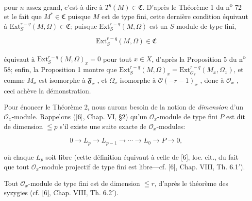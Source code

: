 pour $n$ assez grand, c'est-à-dire à $T^q(M) \in \mathfrak{C}$. D'après le Théorème 1 du n\textsuperscript{o} 72 et le fait que $M^* \in \mathfrak{C}$ puisque $M$ est de type fini, cette dernière condition équivaut à $\mathrm{Ext}_S^{r-q}(M, \Omega) \in \mathfrak{C}$; puisque $\mathrm{Ext}_S^{r-q}(M, \Omega)$ est un $S$-module de type fini,

\begin{equation*}
\mathrm{Ext}_S^{r-q}(M, \Omega) \in \mathfrak{C}
\end{equation*}

équivaut à $\mathrm{Ext}_S^{r-q}(M, \Omega)_x = 0$ pour tout $x \in X$, d'après la Proposition 5 du n\textsuperscript{o} 58; enfin, la Proposition 1 montre que $\mathrm{Ext}_S^{r-q}(M, \Omega)_x = \mathrm{Ext}_{\mathcal{O}_x}^{r-q}(M_x , \Omega_x)$, et comme $M_x$ est isomorphe à $\mathfrak{F}_x$ , et $\Omega_x$ isomorphe à $\mathcal{O}(-r - 1)_x$ , donc à $\mathcal{O}_x$ , ceci achève la démonstration.

Pour énoncer le Théorème 2, nous aurons besoin de la notion de \textit{dimension} d'un $\mathcal{O}_x$-module. Rappelons ([6], Chap. VI, \S2) qu'un $\mathcal{O}_x$-module de type fini $P$ est dit de dimension $\leqq p$ s'il existe une suite exacte de $\mathcal{O}_x$-modules:

\begin{equation*}
0 \rightarrow L_p \rightarrow L_{p-1} \rightarrow \cdots \rightarrow L_0 \rightarrow P \rightarrow 0,
\end{equation*}

où chaque $L_p$ soit libre (cette définition équivaut à celle de [6], loc. cit., du fait que tout $\mathcal{O}_x$-module projectif de type fini est libre---cf. [6], Chap. VIII, Th. 6.1$'$).



%
%
%
Tout $\mathcal{O}_x$-module de type fini est de dimension $\leqq r$, d'après le théorème des syzygies (cf. [6], Chap. VIII, Th. 6.2$'$).

